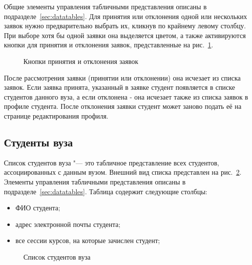 Общие элементы управления табличными представления описаны в подразделе~\ref{sec:datatables}. 
Для принятия или отклонения одной или нескольких заявок нужно предварительно выбрать их, кликнув по крайнему 
левому столбцу. При выборе хотя бы одной заявки она выделяется цветом, а также активируются кнопки для принятия и 
отклонения заявок, представленные на рис.~\ref{img:student:bind_request_list_review}.
\begin{figure}[H]
	\caption{Кнопки принятия и отклонения заявок}
	\label{img:student:bind_request_list_review}
\end{figure}

После рассмотрения заявки (принятии или отклонении) она исчезает из списка заявок. 
Если заявка принята, указанный в заявке студент появляется в списке студентов данного вуза, 
а если отклонена - она исчезает также из списка заявок в профиле студента. 
После отклонения заявки студент может заново подать её на странице редактирования профиля.

\subsection{Студенты вуза}

Список студентов вуза "--- это табличное представление всех студентов, ассоциированных с данным вузом.
Внешний вид списка представлен на рис.~\ref{img:student:univ_student_list}. 
Элементы управления табличными представления описаны в подразделе~\ref{sec:datatables}.
Таблица содержит следующие столбцы:
\begin{itemize}
	\item ФИО студента;
	\item адрес электронной почты студента;
	\item все сессии курсов, на которые зачислен студент;
\end{itemize}

\begin{figure}[H]
	\caption{Список студентов вуза}
	\label{img:student:univ_student_list}
\end{figure}

